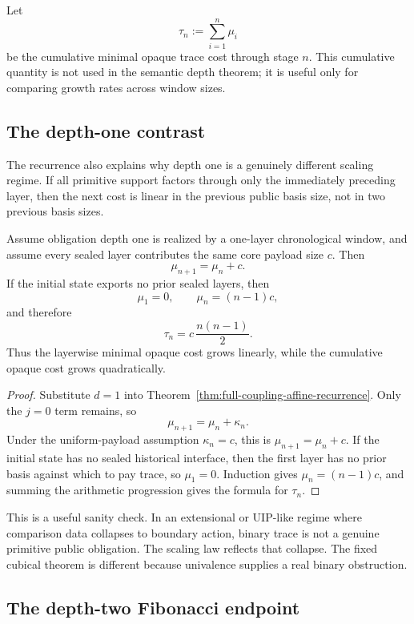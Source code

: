 Let
\[
  \tau_n := \sum_{i=1}^{n}\mu_i
\]
be the cumulative minimal opaque trace cost through stage \(n\).  This cumulative quantity is
not used in the semantic depth theorem; it is useful only for comparing growth rates across
window sizes.

\subsection{The depth-one contrast}
\label{subsec:depth-one-growth}

The recurrence also explains why depth one is a genuinely different scaling regime.  If all
primitive support factors through only the immediately preceding layer, then the next cost is
linear in the previous public basis size, not in two previous basis sizes.

\begin{corollary}
\label{cor:depth-one-affine-growth}
Assume obligation depth one is realized by a one-layer chronological window, and assume every
sealed layer contributes the same core payload size \(c\).  Then
\[
  \mu_{n+1}=\mu_n+c.
\]
If the initial state exports no prior sealed layers, then
\[
  \mu_1=0,
  \qquad
  \mu_n=(n-1)c,
\]
and therefore
\[
  \tau_n = c\,\frac{n(n-1)}{2}.
\]
Thus the layerwise minimal opaque cost grows linearly, while the cumulative opaque cost grows
quadratically.
\end{corollary}

\begin{proof}
Substitute \(d=1\) into Theorem~\ref{thm:full-coupling-affine-recurrence}.  Only the
\(j=0\) term remains, so
\[
  \mu_{n+1}=\mu_n+\kappa_n.
\]
Under the uniform-payload assumption \(\kappa_n=c\), this is
\(\mu_{n+1}=\mu_n+c\).  If the initial state has no sealed historical interface, then the
first layer has no prior basis against which to pay trace, so \(\mu_1=0\).  Induction gives
\(\mu_n=(n-1)c\), and summing the arithmetic progression gives the formula for \(\tau_n\).
\end{proof}

This is a useful sanity check.  In an extensional or UIP-like regime where comparison data
collapses to boundary action, binary trace is not a genuine primitive public obligation.  The
scaling law reflects that collapse.  The fixed cubical theorem is different because univalence
supplies a real binary obstruction.

\subsection{The depth-two Fibonacci endpoint}
\label{subsec:fibonacci-endpoint}

